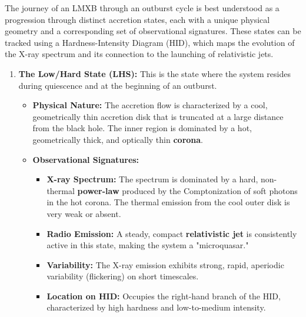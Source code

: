 The journey of an LMXB through an outburst cycle is best understood as a progression through distinct accretion states, each with a unique physical geometry and a corresponding set of observational signatures. These states can be tracked using a Hardness-Intensity Diagram (HID), which maps the evolution of the X-ray spectrum and its connection to the launching of relativistic jets.
\vspace{10pt}
\begin{enumerate}

    \item \textbf{The Low/Hard State (LHS):} This is the state where the system resides during quiescence and at the beginning of an outburst.
    \begin{itemize}
        \item \textbf{Physical Nature:} The accretion flow is characterized by a cool, geometrically thin accretion disk that is truncated at a large distance from the black hole. The inner region is dominated by a hot, geometrically thick, and optically thin \textbf{corona}.
        \item \textbf{Observational Signatures:}
        \begin{itemize}
            \item \textbf{X-ray Spectrum:} The spectrum is dominated by a hard, non-thermal \textbf{power-law} produced by the Comptonization of soft photons in the hot corona. The thermal emission from the cool outer disk is very weak or absent.
            \item \textbf{Radio Emission:} A steady, compact \textbf{relativistic jet} is consistently active in this state, making the system a "microquasar."
            \item \textbf{Variability:} The X-ray emission exhibits strong, rapid, aperiodic variability (flickering) on short timescales.
            \item \textbf{Location on HID:} Occupies the right-hand branch of the HID, characterized by high hardness and low-to-medium intensity.
        \end{itemize}
    \end{itemize}


\end{enumerate}
